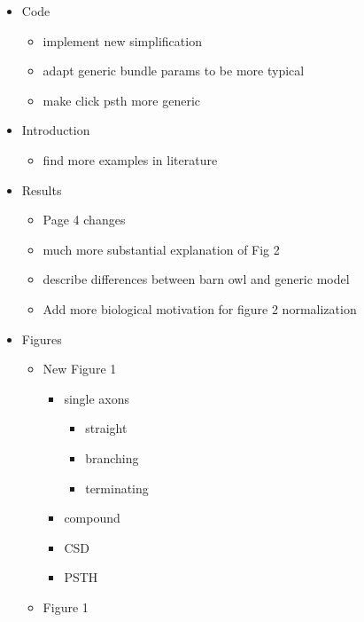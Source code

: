 \documentclass[]{article}
\providecommand{\tightlist}{%
  \setlength{\itemsep}{0pt}\setlength{\parskip}{0pt}}
\begin{document}
\begin{itemize}
\tightlist
\item
  Code

  \begin{itemize}
  \tightlist
  \item
    implement new simplification
  \item
    adapt generic bundle params to be more typical
  \item
    make click psth more generic
  \end{itemize}
\item
  Introduction

  \begin{itemize}
  \tightlist
  \item
    find more examples in literature
  \end{itemize}
\item
  Results

  \begin{itemize}
  \tightlist
  \item
    Page 4 changes
  \item
    much more substantial explanation of Fig 2
  \item
    describe differences between barn owl and generic model
  \item
    Add more biological motivation for figure 2 normalization
  \end{itemize}
\item
  Figures

  \begin{itemize}
  \tightlist
  \item
    New Figure 1

    \begin{itemize}
    \tightlist
    \item
      single axons

      \begin{itemize}
      \tightlist
      \item
        straight
      \item
        branching
      \item
        terminating
      \end{itemize}
    \item
      compound
    \item
      CSD
    \item
      PSTH
    \end{itemize}
  \item
    Figure 1


\end{itemize}
\end{itemize}
\end{document}
